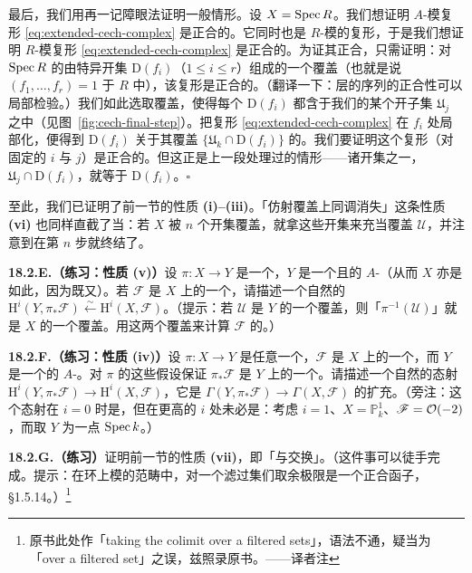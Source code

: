 最后，我们用再一记障眼法证明一般情形。设 $X=\operatorname{Spec} R$。我们想证明 $A$-模复形 \eqref{eq:extended-cech-complex} 是正合的。它同时也是 $R$-模的复形，于是我们想证明 $R$-模复形 \eqref{eq:extended-cech-complex} 是正合的。为证其正合，只需证明：对 $\operatorname{Spec} R$ 的由特异开集 $\mathrm{D}(f_i)$（$1\le i\le r$）组成的一个覆盖（也就是说 $(f_1,\dots,f_r)=1$ 于 $R$ 中），该复形是正合的。（翻译一下：层的序列的正合性可以局部检验。）我们如此选取覆盖，使得每个 $\mathrm{D}(f_i)$ 都含于我们的某个\trAffine{}开子集 $\mathfrak{U}_j$ 之中（见图~\ref{fig:cech-final-step}）。把复形 \eqref{eq:extended-cech-complex} 在 $f_i$ 处局部化，便得到 $\mathrm{D}(f_i)$ 关于其\trAffine{}覆盖 $\{\mathfrak{U}_k\cap\mathrm{D}(f_i)\}$ 的\trCech\trComplexN。我们要证明这个复形（对固定的 $i$ 与 $j$）是正合的。但这正是上一段处理过的情形——诸\trAffine{}开集之一，$\mathfrak{U}_j\cap\mathrm{D}(f_i)$，就等于 $\mathrm{D}(f_i)$。\hfill$\square$

至此，我们已证明了前一节的性质 \textbf{(i)--(iii)}。「仿射覆盖上同调消失」这条性质 \textbf{(vi)} 也同样直截了当：若 $X$ 被 $n$ 个\trAffine{}开集覆盖，就拿这些开集来充当覆盖 $\mathscr{U}$，并注意到\trCech\trComplexN{}在第 $n$ 步就终结了。

\textbf{18.2.E.（练习：性质 (v)）}\quad 设 $\pi\colon X\to Y$ 是一个\trAffine\trMorphism，$Y$ 是一个\trQuasicompact{}且\trSeparated{}的 $A$-\trScheme（从而 $X$ 亦是如此，因为\trAffine{}\trMorphism{}既\trQuasicompact{}又\trSeparated）。若 $\mathscr{F}$ 是 $X$ 上的一个\trQCSheaf，请描述一个自然的\trIsomorphism
$\mathrm{H}^i(Y,\pi_*\mathscr{F})\overset{\sim}{\longleftarrow}\mathrm{H}^i(X,\mathscr{F})$。（提示：若 $\mathscr{U}$ 是 $Y$ 的一个\trAffine{}覆盖，则「$\pi^{-1}(\mathscr{U})$」就是 $X$ 的一个\trAffine{}覆盖。用这两个覆盖来计算 $\mathscr{F}$ 的\trCohomology。）

\textbf{18.2.F.（练习：性质 (iv)）}\quad 设 $\pi\colon X\to Y$ 是任意一个\trQuasicompact\trSeparated{}\trMorphism，$\mathscr{F}$ 是 $X$ 上的一个\trQCSheaf，而 $Y$ 是一个\trQuasicompact\trSeparated{}的 $A$-\trScheme。对 $\pi$ 的这些假设保证 $\pi_*\mathscr{F}$ 是 $Y$ 上的一个\trQCSheaf。请描述一个自然的态射 $\mathrm{H}^i(Y,\pi_*\mathscr{F})\to\mathrm{H}^i(X,\mathscr{F})$，它是 $\Gamma(Y,\pi_*\mathscr{F})\to\Gamma(X,\mathscr{F})$ 的扩充。（旁注：这个态射在 $i=0$ 时是\trIsomorphism，但在更高的 $i$ 处未必是：考虑 $i=1$、$X=\mathbb{P}^1_k$、$\mathscr{F}=\mathcal{O}(-2)$，而取 $Y$ 为一点 $\operatorname{Spec} k$。）

\textbf{18.2.G.（练习）}\quad 证明前一节的性质 \textbf{(vii)}，即「\trCohomology{}与\trFiltered\trColimit{}交换」。（这件事可以徒手完成。提示：在环上模的范畴中，对一个滤过集们取余极限是一个正合函子，\S1.5.14。）\footnote{原书此处作「taking the colimit over a filtered sets」，语法不通，疑当为「over a filtered set」之误，兹照录原书。——译者注}

